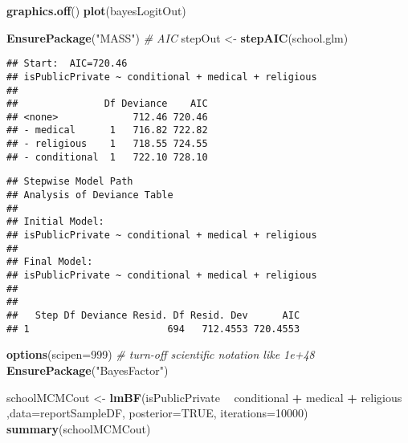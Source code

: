 \documentclass[]{article}
\newenvironment{Shaded}{\begin{snugshade}}{\end{snugshade}}
\newcommand{\CommentTok}[1]{\textcolor[rgb]{0.56,0.35,0.01}{\textit{#1}}}
\newcommand{\DataTypeTok}[1]{\textcolor[rgb]{0.13,0.29,0.53}{#1}}
\newcommand{\DecValTok}[1]{\textcolor[rgb]{0.00,0.00,0.81}{#1}}
\newcommand{\KeywordTok}[1]{\textcolor[rgb]{0.13,0.29,0.53}{\textbf{#1}}}
\newcommand{\NormalTok}[1]{#1}
\newcommand{\OperatorTok}[1]{\textcolor[rgb]{0.81,0.36,0.00}{\textbf{#1}}}
\newcommand{\OtherTok}[1]{\textcolor[rgb]{0.56,0.35,0.01}{#1}}
\newcommand{\StringTok}[1]{\textcolor[rgb]{0.31,0.60,0.02}{#1}}
\begin{document}
\begin{Shaded}
\begin{Highlighting}[]
\KeywordTok{graphics.off}\NormalTok{()}
\KeywordTok{plot}\NormalTok{(bayesLogitOut)}
\end{Highlighting}
\end{Shaded}

\begin{Shaded}
\begin{Highlighting}[]
\KeywordTok{EnsurePackage}\NormalTok{(}\StringTok{"MASS"}\NormalTok{) }\CommentTok{# AIC}
\NormalTok{stepOut <-}\StringTok{ }\KeywordTok{stepAIC}\NormalTok{(school.glm)}
\end{Highlighting}
\end{Shaded}

\begin{verbatim}
## Start:  AIC=720.46
## isPublicPrivate ~ conditional + medical + religious
## 
##               Df Deviance    AIC
## <none>             712.46 720.46
## - medical      1   716.82 722.82
## - religious    1   718.55 724.55
## - conditional  1   722.10 728.10
\end{verbatim}

\begin{Shaded}
\end{Shaded}

\begin{verbatim}
## Stepwise Model Path 
## Analysis of Deviance Table
## 
## Initial Model:
## isPublicPrivate ~ conditional + medical + religious
## 
## Final Model:
## isPublicPrivate ~ conditional + medical + religious
## 
## 
##   Step Df Deviance Resid. Df Resid. Dev      AIC
## 1                        694   712.4553 720.4553
\end{verbatim}

\begin{Shaded}
\begin{Highlighting}[]
\KeywordTok{options}\NormalTok{(}\DataTypeTok{scipen=}\DecValTok{999}\NormalTok{)  }\CommentTok{# turn-off scientific notation like 1e+48}
\KeywordTok{EnsurePackage}\NormalTok{(}\StringTok{"BayesFactor"}\NormalTok{)}

\NormalTok{schoolMCMCout <-}\StringTok{ }\KeywordTok{lmBF}\NormalTok{(isPublicPrivate }\OperatorTok{~}\StringTok{ }\NormalTok{conditional }\OperatorTok{+}\StringTok{ }\NormalTok{medical }\OperatorTok{+}\StringTok{ }\NormalTok{religious ,}\DataTypeTok{data=}\NormalTok{reportSampleDF, }\DataTypeTok{posterior=}\OtherTok{TRUE}\NormalTok{, }\DataTypeTok{iterations=}\DecValTok{10000}\NormalTok{)}
\KeywordTok{summary}\NormalTok{(schoolMCMCout)}
\end{Highlighting}
\end{Shaded}
\end{document}
